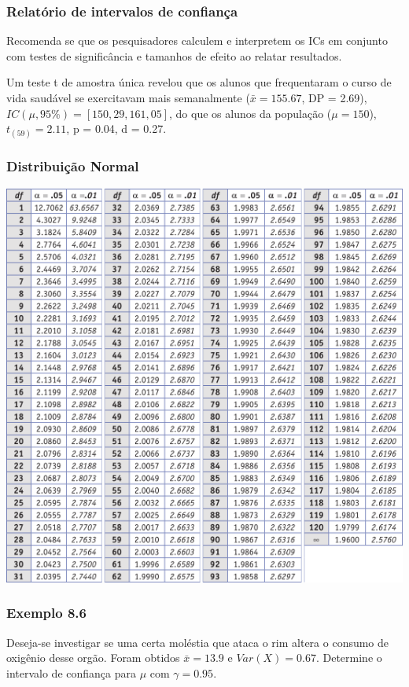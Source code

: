 \documentclass[11pt]{beamer}
\begin{document}
\begin{frame}
\frametitle{Relatório de intervalos de confiança}

Recomenda se que os pesquisadores calculem e interpretem os ICs em conjunto com testes de significância e tamanhos de efeito ao relatar resultados. 

Um teste t de amostra única revelou que os alunos que frequentaram o curso de vida saudável se exercitavam mais semanalmente (\(\bar{x} = 155.67\), DP = 2.69), \(IC(\mu, 95\%)= [150,29, 161,05]\), do que os alunos da população ($\mu = 150$), $t_{(59)} = 2.11$, p = 0.04, d = 0.27.

\end{frame}

\begin{frame}
\frametitle{Distribuição Normal}

\begin{center}\includegraphics[width=0.7\linewidth]{figs/tabela_t} \end{center}
\end{frame}


\begin{frame}
\frametitle{Exemplo 8.6}
Deseja-se investigar se uma certa moléstia que ataca o rim altera o consumo de oxigênio desse orgão. Foram obtidos \(\bar{x}=13.9\) e \(Var(X)=0.67\). Determine o intervalo de confiança para \(\mu\) com \(\gamma=0.95\).
\vspace{1in}
\vspace{1in}

\end{frame}
\end{document}
